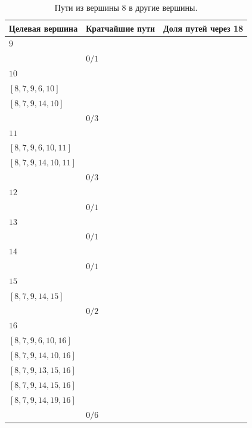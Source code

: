 \documentclass[12pt, a4paper]{extarticle}
\begin{document}
\begin{table}[h!]
    \caption{Пути из вершины $8$ в другие вершины.}
    \label{tbl:10-8}
    \begin{tabularx}{\textwidth}{|X|X|X|}
        \hline 
        Целевая вершина & Кратчайшие пути & Доля путей через 18 \\
        \hline 
        $9$ & \begin{tabular}{@{}l@{}} $[8, 7, 9]$ \\ \end{tabular} & $0/1$ \\
        \hline
        $10$ & \begin{tabular}{@{}l@{}} $[8, 7, 3, 6, 10]$ \\  $[8, 7, 9, 6, 10]$ \\  $[8, 7, 9, 14, 10]$ \\ \end{tabular} & $0/3$ \\
        \hline
        $11$ & \begin{tabular}{@{}l@{}} $[8, 7, 3, 6, 10, 11]$ \\  $[8, 7, 9, 6, 10, 11]$ \\  $[8, 7, 9, 14, 10, 11]$ \\ \end{tabular} & $0/3$ \\
        \hline
        $12$ & \begin{tabular}{@{}l@{}} $[8, 7, 9, 13, 12]$ \\ \end{tabular} & $0/1$ \\
        \hline
        $13$ & \begin{tabular}{@{}l@{}} $[8, 7, 9, 13]$ \\ \end{tabular} & $0/1$ \\
        \hline
        $14$ & \begin{tabular}{@{}l@{}} $[8, 7, 9, 14]$ \\ \end{tabular} & $0/1$ \\
        \hline
        $15$ & \begin{tabular}{@{}l@{}} $[8, 7, 9, 13, 15]$ \\  $[8, 7, 9, 14, 15]$ \\ \end{tabular} & $0/2$ \\
        \hline
        $16$ & \begin{tabular}{@{}l@{}} $[8, 7, 3, 6, 10, 16]$ \\  $[8, 7, 9, 6, 10, 16]$ \\  $[8, 7, 9, 14, 10, 16]$ \\  $[8, 7, 9, 13, 15, 16]$ \\  $[8, 7, 9, 14, 15, 16]$ \\  $[8, 7, 9, 14, 19, 16]$ \\ \end{tabular} & $0/6$ \\

\end{tabularx}
\end{table}
\end{document}
